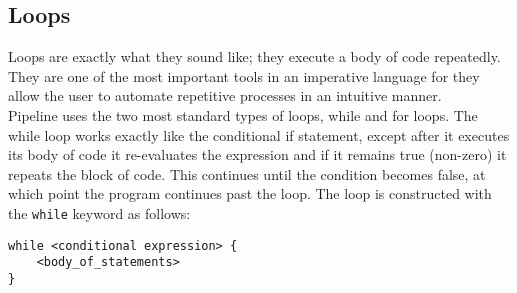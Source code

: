 \documentclass[./LRM_main.tex]{subfiles}
\begin{document}
\subsection{Loops}
Loops are exactly what they sound like; they execute a body of code repeatedly. They are one of the most important tools in an imperative language for they allow the user to automate repetitive processes in an intuitive manner.\\
Pipeline uses the two most standard types of loops, while and for loops. The while loop works exactly like the conditional if statement, except after it executes its body of code it re-evaluates the expression and if it remains true (non-zero) it repeats the block of code. This continues until the condition becomes false, at which point the program continues past the loop. The loop is constructed with the \texttt{while} keyword as follows:
\begin{lstlisting}
while <conditional expression> {
	<body_of_statements>
}
\end{lstlisting}
\end{document}

